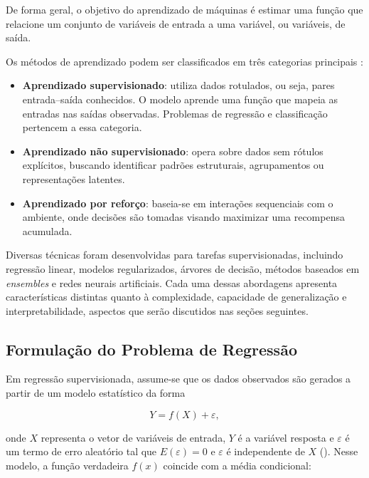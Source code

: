 De forma geral, o objetivo do aprendizado de máquinas é estimar uma função que relacione um conjunto de variáveis de entrada a uma variável, ou variáveis, de saída.

Os métodos de aprendizado podem ser classificados em três categorias principais \cite{Sarkar2018PML}:

\begin{itemize}
    \item \textbf{Aprendizado supervisionado}: utiliza dados rotulados, ou seja, pares entrada–saída conhecidos. O modelo aprende uma função que mapeia as entradas nas saídas observadas. Problemas de regressão e classificação pertencem a essa categoria.
    
    \item \textbf{Aprendizado não supervisionado}: opera sobre dados sem rótulos explícitos, buscando identificar padrões estruturais, agrupamentos ou representações latentes.
    
    \item \textbf{Aprendizado por reforço}: baseia-se em interações sequenciais com o ambiente, onde decisões são tomadas visando maximizar uma recompensa acumulada.
\end{itemize}



Diversas técnicas foram desenvolvidas para tarefas supervisionadas, incluindo regressão linear, modelos regularizados, árvores de decisão, métodos baseados em \textit{ensembles} e redes neurais artificiais. Cada uma dessas abordagens apresenta características distintas quanto à complexidade, capacidade de generalização e interpretabilidade, aspectos que serão discutidos nas seções seguintes.

\subsection{Formulação do Problema de Regressão}

Em regressão supervisionada, assume-se que os dados observados são gerados a partir de um modelo estatístico da forma

\begin{equation}
Y = f(X) + \varepsilon,
\end{equation}

onde $X$ representa o vetor de variáveis de entrada, $Y$ é a variável resposta e $\varepsilon$ é um termo de erro aleatório tal que $E(\varepsilon)=0$ e $\varepsilon$ é independente de $X$ (\cite{Sarkar2018PML}). Nesse modelo, a função verdadeira $f(x)$ coincide com a média condicional:

